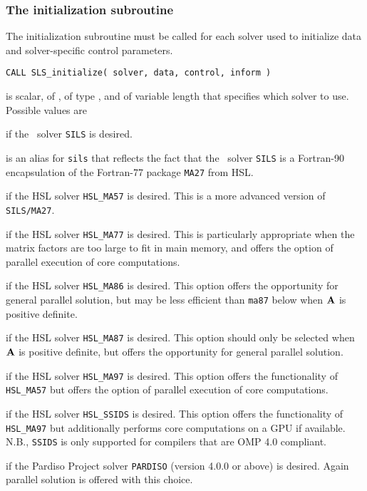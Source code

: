 \documentclass{galahad}
\newcommand{\packagename}{SLS}
\begin{document}
\subsubsection{The initialization subroutine}\label{subinit}
The initialization subroutine must be called for each solver used
to initialize data and solver-specific control parameters.

\hskip0.5in
{\tt CALL \packagename\_initialize( solver, data, control, inform )}
\begin{description}

 is scalar, of \intentin, of type \character, and of variable
length that specifies which solver to use. Possible values are
\begin{description}
 if the \galahad\ solver {\tt SILS} is desired.

 is an alias for {\tt sils} that reflects the fact that the \galahad\
 solver {\tt SILS} is a Fortran-90 encapsulation of the Fortran-77
 package {\tt MA27} from HSL.

 if the HSL solver {\tt HSL\_MA57} is desired. This is a more
advanced version of {\tt SILS/MA27}.

 if the HSL solver {\tt HSL\_MA77} is desired. This is particularly
appropriate when the matrix factors are too large to fit in main memory,
and offers the option of parallel execution of core computations.

 if the HSL solver {\tt HSL\_MA86} is desired. This option
offers the opportunity for general parallel solution, but may be
less efficient than {\tt ma87} below when ${\mathbf{A}}$ is positive definite.

 if the HSL solver {\tt HSL\_MA87} is desired. This option should
only be selected when ${\mathbf{A}}$ is positive definite, but
offers the opportunity for general parallel solution.

 if the HSL solver {\tt HSL\_MA97} is desired. This option offers
the functionality of {\tt HSL\_MA57} but offers the option of parallel
execution of core computations.

 if the HSL solver {\tt HSL\_SSIDS} is desired. This option offers
the functionality of {\tt HSL\_MA97} but additionally performs
core computations on a GPU if available. N.B., {\tt SSIDS} is only
supported for compilers that are OMP 4.0 compliant.

 if the Pardiso Project solver {\tt PARDISO} (version 4.0.0
or above) is desired. Again parallel solution is offered with this choice.


\end{description}
\end{description}
\end{document}

